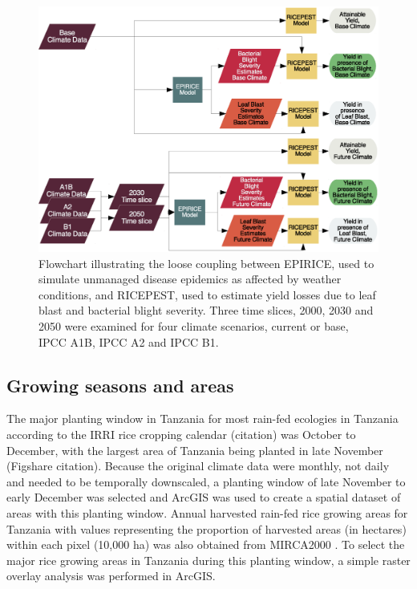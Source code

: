 \documentclass[preprint,review,12pt]{elsarticle}
\begin{document}
     \begin{figure}[H]
      \includegraphics[width = 140mm]{figures/Simulation_Tree_Flowchart}
      \caption{Flowchart illustrating the loose coupling between EPIRICE, used to simulate unmanaged disease epidemics as affected by weather conditions, and RICEPEST, used to estimate yield losses due to leaf blast and bacterial blight severity. Three time slices, 2000, 2030 and 2050 were examined for four climate scenarios, current or base, IPCC A1B, IPCC A2 and IPCC B1.}
      \label{Flowchart}
    \end{figure} 
    
    \subsection{Growing seasons and areas}
    The major planting window in Tanzania for most rain-fed ecologies in Tanzania according to the IRRI rice cropping calendar (citation) was October to December, with the largest area of Tanzania being planted in late November (Figshare citation). Because the original climate data were monthly, not daily and needed to be temporally downscaled, a planting window of late November to early December was selected and ArcGIS was used to create a spatial dataset of areas with this planting window. Annual harvested rain-fed rice growing areas for Tanzania with values representing the proportion of harvested areas (in hectares) within each pixel (10,000 ha) was also obtained from MIRCA2000 \cite{Portmann2010}. To select the major rice growing areas in Tanzania during this planting window, a simple raster overlay analysis was performed in ArcGIS.
    
\end{document}
